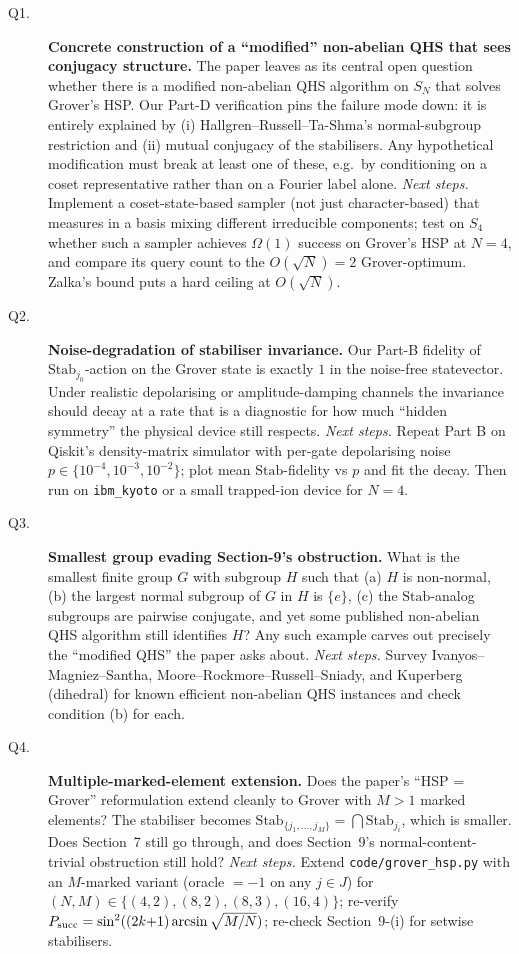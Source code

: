 \begin{description}

\item[Q1.] \textbf{Concrete construction of a ``modified'' non-abelian QHS
that sees conjugacy structure.}  The paper leaves as its central open
question whether there is a modified non-abelian QHS algorithm on
$S_N$ that solves Grover's HSP.  Our Part-D verification pins the
failure mode down: it is entirely explained by (i)
Hallgren--Russell--Ta-Shma's normal-subgroup restriction and (ii) mutual
conjugacy of the stabilisers.  Any hypothetical modification must break
at least one of these, e.g.~by conditioning on a coset representative
rather than on a Fourier label alone.
\emph{Next steps.} Implement a coset-state-based sampler (not just
character-based) that measures in a basis mixing different irreducible
components; test on $S_4$ whether such a sampler achieves $\Omega(1)$
success on Grover's HSP at $N=4$, and compare its query count to the
$O(\sqrt N)=2$ Grover-optimum.  Zalka's bound puts a hard ceiling at
$O(\sqrt N)$.

\item[Q2.] \textbf{Noise-degradation of stabiliser invariance.}  Our
Part-B fidelity of $\mathrm{Stab}_{j_0}$-action on the Grover state is
exactly $1$ in the noise-free statevector.  Under realistic
depolarising or amplitude-damping channels the invariance should decay
at a rate that is a diagnostic for how much ``hidden symmetry'' the
physical device still respects.
\emph{Next steps.} Repeat Part B on Qiskit's density-matrix simulator
with per-gate depolarising noise $p\in\{10^{-4},10^{-3},10^{-2}\}$;
plot mean $\mathrm{Stab}$-fidelity vs $p$ and fit the decay.  Then run
on \texttt{ibm\_kyoto} or a small trapped-ion device for $N=4$.

\item[Q3.] \textbf{Smallest group evading Section-9's obstruction.}
What is the smallest finite group $G$ with subgroup $H$ such that
(a) $H$ is non-normal, (b) the largest normal subgroup of $G$ in $H$
is $\{e\}$, (c) the $\mathrm{Stab}$-analog subgroups are pairwise
conjugate, and yet some published non-abelian QHS algorithm still
identifies $H$?  Any such example carves out precisely the ``modified
QHS'' the paper asks about.
\emph{Next steps.} Survey Ivanyos--Magniez--Santha,
Moore--Rockmore--Russell--Sniady, and Kuperberg (dihedral) for known
efficient non-abelian QHS instances and check condition (b) for each.

\item[Q4.] \textbf{Multiple-marked-element extension.}  Does the paper's
``HSP = Grover'' reformulation extend cleanly to Grover with $M>1$
marked elements?  The stabiliser becomes
$\mathrm{Stab}_{\{j_1,\dots,j_M\}}=\bigcap\mathrm{Stab}_{j_i}$, which
is smaller.  Does Section~7 still go through, and does Section~9's
normal-content-trivial obstruction still hold?
\emph{Next steps.} Extend \texttt{code/grover\_hsp.py} with an
$M$-marked variant (oracle $=-1$ on any $j\in J$) for
$(N,M)\in\{(4,2),(8,2),(8,3),(16,4)\}$; re-verify
$P_{\rm succ}=\sin^{2}((2k{+}1)\arcsin\sqrt{M/N})$; re-check
Section~9-(i) for setwise stabilisers.


\end{description}
